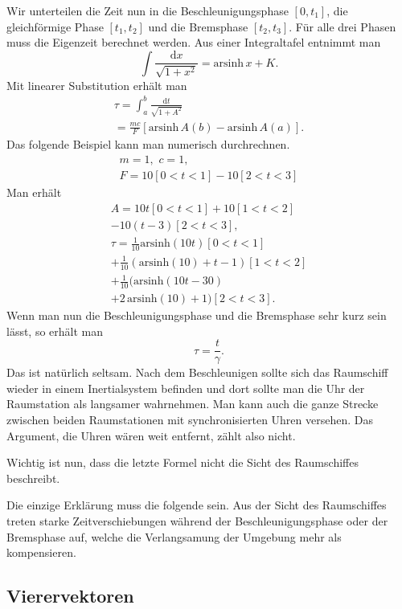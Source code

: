 \documentclass[a4paper,11pt,fleqn,twocolumn,twoside,dvipdfmx]{scrartcl}
\begin{document}
Wir unterteilen die Zeit nun in die Beschleunigungsphase $[0,t_1]$,
die gleichförmige Phase $[t_1,t_2]$ und die Bremsphase $[t_2,t_3]$.
Für alle drei Phasen muss die Eigenzeit berechnet werden. Aus einer
Integraltafel entnimmt man%
\[\int \frac{\mathrm dx}{\sqrt{1+x^2}} = \mathrm{arsinh}\,x+K.\]
Mit linearer Substitution erhält man%
\begin{gather*}
\tau = \int_a^b \frac{\mathrm dt}{\sqrt{1+A^2}}\\
= \frac{mc}{F}[\mathrm{arsinh}\,A(b)-\mathrm{arsinh}\,A(a)].
\end{gather*}
%
Das folgende Beispiel kann man numerisch durchrechnen.
\begin{gather*}
m=1,\,\,c=1,\\
F = 10[0<t<1]-10[2<t<3]
\end{gather*}
Man erhält
\begin{gather*}
A = 10t[0<t<1]+10[1<t<2]\\
-10(t-3)[2<t<3],\\
\tau = \frac{1}{10}\mathrm{arsinh}(10t)[0<t<1]\\
+ \frac{1}{10}(\mathrm{arsinh}(10)+t-1)[1<t<2]\\
+ \frac{1}{10}(\mathrm{arsinh}(10t-30)\\
+2\,\mathrm{arsinh}(10)+1)[2<t<3].
\end{gather*}
Wenn man nun die Beschleunigungsphase und die Bremsphase sehr kurz
sein lässt, so erhält man%
\[\tau = \frac{t}{\gamma}.\]
Das ist natürlich seltsam. Nach dem Beschleunigen sollte sich das
Raumschiff wieder in einem Inertialsystem befinden und dort sollte
man die Uhr der Raumstation als langsamer wahrnehmen. Man kann auch
die ganze Strecke zwischen beiden Raumstationen mit synchronisierten
Uhren versehen. Das Argument, die Uhren wären weit entfernt,
zählt also nicht.

Wichtig ist nun, dass die letzte Formel nicht die Sicht des
Raumschiffes beschreibt.

Die einzige Erklärung muss die folgende sein. Aus der Sicht des
Raumschiffes treten starke Zeitverschiebungen während der
Beschleunigungsphase oder der Bremsphase auf, welche die Verlangsamung
der Umgebung mehr als kompensieren.


\subsection{Vierervektoren}
\end{document}
